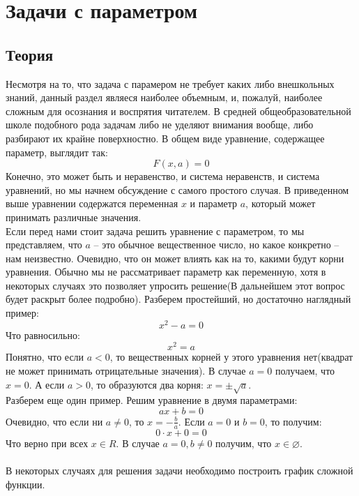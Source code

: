 \documentclass{article}
\begin{document}
\section{Задачи с параметром}
\subsection{Теория}
Несмотря на то, что задача с парамером не требует каких либо внешкольных знаний, данный раздел являеся наиболее объемным, и, пожалуй, наиболее сложным для осознания и воспрятия читателем. В средней общеобразовательной школе
подобного рода задачам либо не уделяют внимания вообще, либо разбирают их крайне поверхностно. В общем виде уравнение, содержащее параметр, выглядит так:
\[ F(x, a) = 0 \]
Конечно, это может быть и неравенство, и система неравенств, и система уравнений, но мы начнем обсуждение с самого простого случая. В приведенном выше уравнении содержатся переменная $x$ и параметр $a$, который может принимать различные значения. 
\\
Если перед нами стоит задача решить уравнение с параметром,
то мы представляем, что $a$ -- это обычное вещественное 
число, но какое конкретно -- нам неизвестно. Очевидно, что 
он может влиять как на то, какими будут корни уравнения. Обычно мы не рассматривает параметр как 
переменную, хотя в некоторых случаях это позволяет упросить 
решение(В дальнейшем этот вопрос будет раскрыт более 
подробно).
Разберем простейший, но достаточно наглядный пример:
\[
x^2 - a = 0
\]
Что равносильно:
\[
x^2 = a
\]
Понятно, что если $a < 0$, то вещественных корней у этого
уравнения нет(квадрат не может принимать отрицательные
значения). В случае $a = 0$ получаем, что $x = 0$. А если
$a > 0$, то образуются два корня: $x = \pm \sqrt{a}$.
\\
Разберем еще один пример. Решим уравнение в двумя параметрами:
\[
ax + b = 0
\]
Очевидно, что если ни $a \neq 0$, то $x = 
-\frac{b}{a}$. Если $a = 0$ и $b = 0$, то получим:
\[0 \cdot x + 0 = 0 \]
Что верно при всех $x \in R$. В случае $a=0,b\neq 0$ получим, что $x \in \varnothing$. 
\\
\\
В некоторых случаях для решения задачи необходимо построить
график сложной функции.
\\
\end{document}
